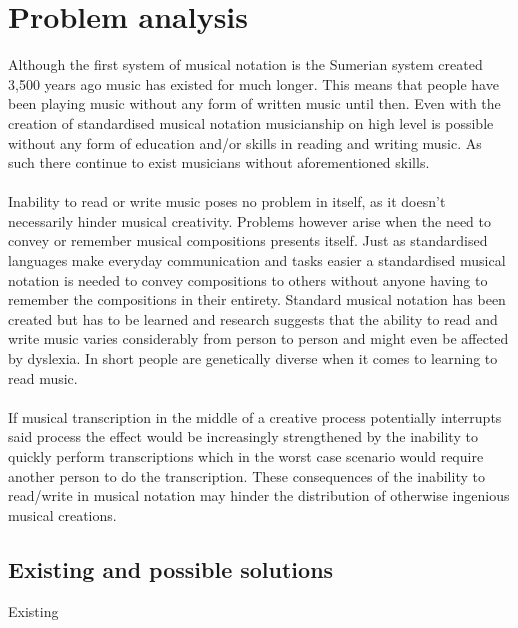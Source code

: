 \section{Problem analysis}
Although the first system of musical notation is the Sumerian system created 3,500 years ago music has existed for much longer. \cite{origins} This means that people have been playing music without any form of written music until then. Even with the creation of standardised musical notation musicianship on high level is possible without any form of education and/or skills in reading and writing music. As such there continue to exist musicians without aforementioned skills.\\\\
Inability to read or write music poses no problem in itself, as it doesn't necessarily hinder musical creativity. Problems however arise when the need to convey or remember musical compositions presents itself. Just as standardised languages make everyday communication and tasks easier a standardised musical notation is needed to convey compositions to others without anyone having to remember the compositions in their entirety. Standard musical notation has been created but has to be learned and research suggests that the ability to read and write music varies considerably from person to person and might even be affected by dyslexia. \cite{dyslexia} In short people are genetically diverse when it comes to learning to read music.\\\\
If musical transcription in the middle of a creative process potentially interrupts said process the effect would be increasingly strengthened by the inability to quickly perform transcriptions which in the worst case scenario would require another person to do the transcription. These consequences of the inability to read/write in musical notation may hinder the distribution of otherwise ingenious musical creations.
\subsection{Existing and possible solutions}
Existing

%
